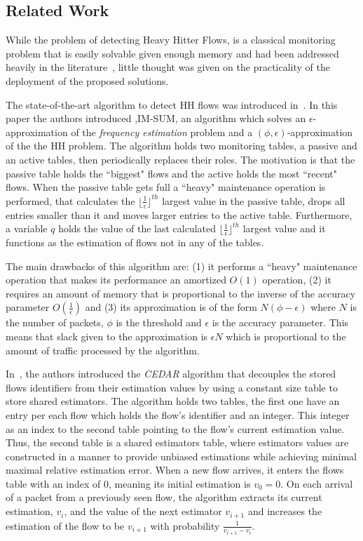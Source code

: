 \subsection{Related Work}

While the problem of detecting Heavy Hitter Flows, is a classical monitoring problem that is easily solvable given enough memory and had been addressed heavily in the literature~\cite{fang1999computing,gilbert2001surfing,karp2003simple,Demaine2002,slidingHH,basat2017optimal,zadnik2011evolution}, little thought was given on the practicality of the deployment of the proposed solutions.

The state-of-the-art algorithm to detect HH flows was introduced in~\cite{basat2017optimal}. In this paper the authors introduced ,IM-SUM, an algorithm which solves an $\epsilon$-approximation of the \textit{frequency estimation} problem and a $(\phi, \epsilon)$-approximation of the the HH problem. The algorithm holds two monitoring tables, a passive and an active tables, then periodically replaces their roles. The motivation is that the passive table holds the ``biggest" flows and the active holds the most ``recent" flows. When the passive table gets full a ``heavy" maintenance operation is performed, that calculates the $\lfloor\frac{1}{\epsilon}\rfloor^{th}$ largest value in the passive table, drops all entries smaller than it and moves larger entries to the active table. Furthermore, a variable $q$ holds the value of the last calculated $\lfloor\frac{1}{\epsilon}\rfloor^{th}$ largest value and it functions as the estimation of flows not in any of the tables.

The main drawbacks of this algorithm are: (1) it performs a ``heavy" maintenance operation that makes its performance an amortized $O(1)$ operation, (2) it requires an amount of memory that is proportional to the inverse of the accuracy parameter $O(\frac{1}{\epsilon})$ and (3) its approximation is of the form $N(\phi -\epsilon)$ where $N$ is the number of packets, $\phi$ is the threshold and $\epsilon$ is the accuracy parameter. This means that slack given to the approximation is $\epsilon N$ which is proportional to the amount of traffic processed by the algorithm.

In~\cite{CEDAR}, the authors introduced the \textit{CEDAR} algorithm that decouples the stored flows identifiers from their estimation values by using a constant size table to store shared estimators. The algorithm holds two tables, the first one have an entry per each flow which holds the flow's identifier and an integer. This integer as an index to the second table pointing to the flow's current estimation value. Thus, the second table is a shared estimators table, where estimators values are constructed in a manner to provide unbiased estimations while achieving minimal maximal relative estimation error. When a new flow arrives, it enters the flows table with an index of $0$, meaning its initial estimation is $v_0=0$. On each arrival of a packet from a previously seen flow, the algorithm extracts its current estimation, $v_i$, and the value of the next estimator $v_{i+1}$ and increases the estimation of the flow to be $v_{i+1}$ with probability $\frac{1}{v_{i+1}-v_{i}}$.

